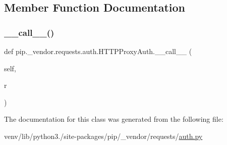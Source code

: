 \subsection{Member Function Documentation}
\mbox{\label{classpip_1_1__vendor_1_1requests_1_1auth_1_1HTTPProxyAuth_a35d052d42e2ea248a50cb017bae48c4f}} 
\subsubsection{\texorpdfstring{\+\_\+\+\_\+call\+\_\+\+\_\+()}{\_\_call\_\_()}}
{\footnotesize\ttfamily def pip.\+\_\+vendor.\+requests.\+auth.\+H\+T\+T\+P\+Proxy\+Auth.\+\_\+\+\_\+call\+\_\+\+\_\+ (\begin{DoxyParamCaption}\item[{}]{self,  }\item[{}]{r }\end{DoxyParamCaption})}



The documentation for this class was generated from the following file\+:\begin{DoxyCompactItemize}
\item 
venv/lib/python3./site-\/packages/pip/\+\_\+vendor/requests/\hyperlink{__vendor_2requests_2auth_8py}{auth.\+py}\end{DoxyCompactItemize}
